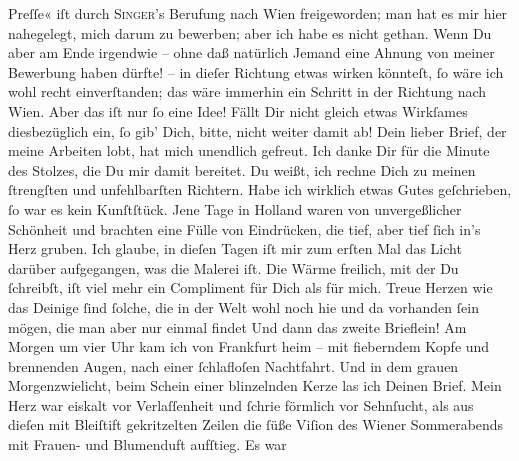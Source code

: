                   Preſſe« iſt durch \textsc{Singer}’s Berufung nach {\pb}Wien freigeworden; man hat es mir hier nahegelegt,
               mich darum zu bewerben; aber ich habe es nicht gethan. Wenn Du aber am Ende irgendwie
               – ohne daß natürlich Jemand eine Ahnung von meiner Bewerbung haben dürfte! – in
               dieſer Richtung etwas wirken könnteſt, ſo wäre ich wohl recht einverſtanden; das wäre
               immerhin ein Schritt in der Richtung nach Wien.
               Aber das iſt nur ſo eine Idee! Fällt Dir nicht gleich etwas Wirkſames
                  diesbezüglich\strikeout{\textcolor{gray}{er}} ein, ſo gib’ Dich, bitte, nicht weiter damit ab! {\dotsfour}
               Dein lieber Brief, der meine Arbeiten lobt, hat mich unendlich gefreut. Ich danke Dir
               für die Minute des Stolzes, die Du mir damit bereitet. Du weißt, ich rechne Dich zu
               meinen ſtrengſten und unfehlbarſten Richtern. Habe ich wirklich etwas Gutes
               geſchrieben, ſo war es kein Kunſtſtück. Jene Tage in Holland waren von unvergeßlicher Schönheit und brachten eine Fülle von
               Eindrücken, die tief,  aber tief ſich in’s Herz gruben. Ich glaube, in
               dieſen Tagen iſt mir zum erſten Mal das Licht darüber aufgegangen, was die Malerei
               iſt. Die Wärme freilich, mit der Du ſchreibſt, iſt \strikeout{\textcolor{gray}{fie}} viel mehr {\pb}ein Compliment für Dich als für
               mich. Treue Herzen wie das Deinige ſind ſolche, die in der Welt wohl noch hie und da
               vorhanden ſein mögen, die man aber nur einmal findet{\dotsfour} Und
               dann das zweite Brieflein! Am Morgen um vier Uhr kam ich  von Frankfurt
               heim – mit fieberndem Kopfe und brennenden Augen, nach einer ſchlafloſen Nachtfahrt.
               Und in dem grauen Morgenzwielicht, beim Schein einer blinzelnden Kerze las ich Deinen
               Brief. Mein Herz war eiskalt vor Verlaſſenheit und ſchrie förmlich vor Sehnſucht, als
               aus dieſen mit Bleiſtift gekritzelten Zeilen die ſüße Viſion des Wiener Sommerabends mit Frauen- und Blumenduft aufſtieg. Es war
